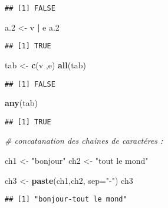 \documentclass[
]{article}
\newenvironment{Shaded}{\begin{snugshade}}{\end{snugshade}}
\newcommand{\AttributeTok}[1]{\textcolor[rgb]{0.13,0.29,0.53}{#1}}
\newcommand{\CommentTok}[1]{\textcolor[rgb]{0.56,0.35,0.01}{\textit{#1}}}
\newcommand{\FloatTok}[1]{\textcolor[rgb]{0.00,0.00,0.81}{#1}}
\newcommand{\FunctionTok}[1]{\textcolor[rgb]{0.13,0.29,0.53}{\textbf{#1}}}
\newcommand{\NormalTok}[1]{#1}
\newcommand{\OtherTok}[1]{\textcolor[rgb]{0.56,0.35,0.01}{#1}}
\newcommand{\SpecialCharTok}[1]{\textcolor[rgb]{0.81,0.36,0.00}{\textbf{#1}}}
\newcommand{\StringTok}[1]{\textcolor[rgb]{0.31,0.60,0.02}{#1}}
\begin{document}
\begin{verbatim}
## [1] FALSE
\end{verbatim}

\begin{Shaded}
\begin{Highlighting}[]
\NormalTok{a}\FloatTok{.2} \OtherTok{\textless{}{-}}\NormalTok{ v }\SpecialCharTok{|}\NormalTok{ e}
\NormalTok{a}\FloatTok{.2}
\end{Highlighting}
\end{Shaded}

\begin{verbatim}
## [1] TRUE
\end{verbatim}

\begin{Shaded}
\begin{Highlighting}[]
\NormalTok{tab }\OtherTok{\textless{}{-}} \FunctionTok{c}\NormalTok{(v ,e)}
\FunctionTok{all}\NormalTok{(tab)}
\end{Highlighting}
\end{Shaded}

\begin{verbatim}
## [1] FALSE
\end{verbatim}

\begin{Shaded}
\begin{Highlighting}[]
\FunctionTok{any}\NormalTok{(tab)}
\end{Highlighting}
\end{Shaded}

\begin{verbatim}
## [1] TRUE
\end{verbatim}

\begin{Shaded}
\begin{Highlighting}[]
\CommentTok{\# concatanation des chaines de caractéres :}

\NormalTok{ch1 }\OtherTok{\textless{}{-}} \StringTok{"bonjour"}
\NormalTok{ch2 }\OtherTok{\textless{}{-}} \StringTok{"tout le mond"}

\NormalTok{ch3 }\OtherTok{\textless{}{-}} \FunctionTok{paste}\NormalTok{(ch1,ch2, }\AttributeTok{sep=}\StringTok{"{-}"}\NormalTok{)}
\NormalTok{ch3}
\end{Highlighting}
\end{Shaded}

\begin{verbatim}
## [1] "bonjour-tout le mond"
\end{verbatim}
\end{document}
